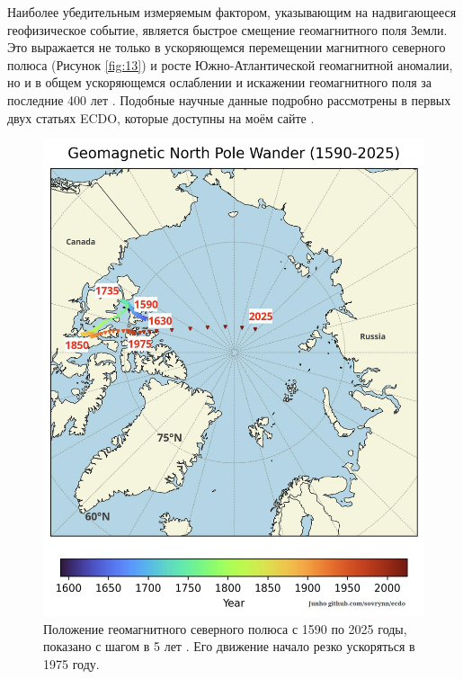 \documentclass[10pt,twocolumn,letterpaper]{article}
\begin{document}
Наиболее убедительным измеряемым фактором, указывающим на надвигающееся геофизическое событие, является быстрое смещение геомагнитного поля Земли. Это выражается не только в ускоряющемся перемещении магнитного северного полюса (Рисунок \ref{fig:13}) и росте Южно-Атлантической геомагнитной аномалии, но и в общем ускоряющемся ослаблении и искажении геомагнитного поля за последние 400 лет \cite{3}. Подобные научные данные подробно рассмотрены в первых двух статьях ECDO, которые доступны на моём сайте \cite{3}.

\begin{figure}[t]
\begin{center}
   \includegraphics[width=1\linewidth]{npw.jpg}
\end{center}
   \caption{Положение геомагнитного северного полюса с 1590 по 2025 годы, показано с шагом в 5 лет \cite{41}. Его движение начало резко ускоряться в 1975 году.}
\label{fig:13}
\label{fig:onecol}
\end{figure}
\end{document}
